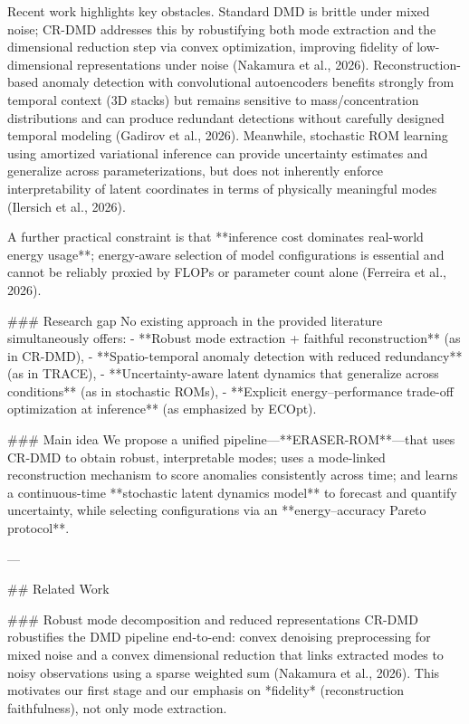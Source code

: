 Recent work highlights key obstacles. Standard DMD is brittle under mixed noise; CR-DMD addresses this by robustifying both mode extraction and the dimensional reduction step via convex optimization, improving fidelity of low-dimensional representations under noise (Nakamura et al., 2026). Reconstruction-based anomaly detection with convolutional autoencoders benefits strongly from temporal context (3D stacks) but remains sensitive to mass/concentration distributions and can produce redundant detections without carefully designed temporal modeling (Gadirov et al., 2026). Meanwhile, stochastic ROM learning using amortized variational inference can provide uncertainty estimates and generalize across parameterizations, but does not inherently enforce interpretability of latent coordinates in terms of physically meaningful modes (Ilersich et al., 2026).

A further practical constraint is that **inference cost dominates real-world energy usage**; energy-aware selection of model configurations is essential and cannot be reliably proxied by FLOPs or parameter count alone (Ferreira et al., 2026).

### Research gap  
No existing approach in the provided literature simultaneously offers:
- **Robust mode extraction + faithful reconstruction** (as in CR-DMD),
- **Spatio-temporal anomaly detection with reduced redundancy** (as in TRACE),
- **Uncertainty-aware latent dynamics that generalize across conditions** (as in stochastic ROMs),
- **Explicit energy–performance trade-off optimization at inference** (as emphasized by ECOpt).

### Main idea  
We propose a unified pipeline—**ERASER-ROM**—that uses CR-DMD to obtain robust, interpretable modes; uses a mode-linked reconstruction mechanism to score anomalies consistently across time; and learns a continuous-time **stochastic latent dynamics model** to forecast and quantify uncertainty, while selecting configurations via an **energy–accuracy Pareto protocol**.

---

## Related Work  

### Robust mode decomposition and reduced representations  
CR-DMD robustifies the DMD pipeline end-to-end: convex denoising preprocessing for mixed noise and a convex dimensional reduction that links extracted modes to noisy observations using a sparse weighted sum (Nakamura et al., 2026). This motivates our first stage and our emphasis on *fidelity* (reconstruction faithfulness), not only mode extraction.

